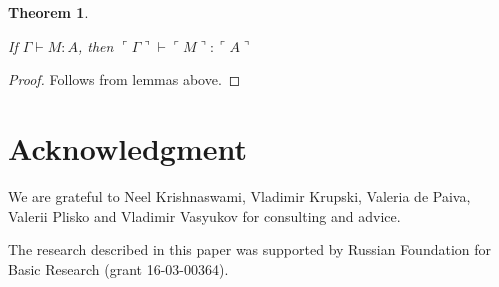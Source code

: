 \documentclass[a4paper]{article}
\newtheorem{theorem}{Theorem}
\begin{document}
\begin{theorem}
  $ $

  If $\Gamma \vdash M : A$, then $\ulcorner \Gamma \urcorner \vdash \ulcorner M \urcorner : \ulcorner A \urcorner$
\end{theorem}

\begin{proof}
  Follows from lemmas above.
\end{proof}


\section{Acknowledgment}

  We are grateful to Neel Krishnaswami, Vladimir Krupski, Valeria de Paiva, Valerii Plisko and Vladimir Vasyukov for consulting and advice.

  The research described in this paper was supported by Russian Foundation for Basic Research (grant 16-03-00364).

\end{document}
